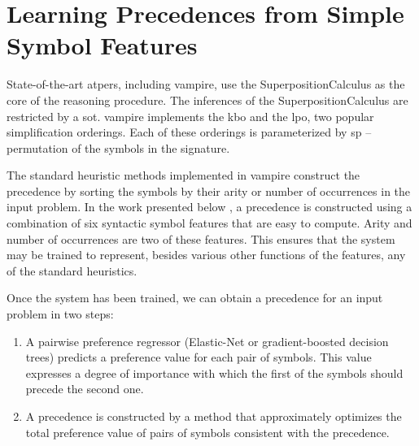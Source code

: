 \newcommand*{\IncludePaper}[2][height=\paperheight-1.5in]{}

\newcommand{\ResultSection}{\chapter}


\ResultSection{Learning Precedences from Simple Symbol Features}
\label{sec:results:simple}

State-of-the-art \glspl{atper}, including \gls{vampire}, use the \gls{SuperpositionCalculus} as the core of the reasoning procedure.
The inferences of the \gls{SuperpositionCalculus} are restricted by a \gls{sot}.
\Gls{vampire} implements the \acrfull{kbo} and the \gls{lpo}, two popular simplification orderings.
Each of these orderings is parameterized by \gls{sp} -- permutation of the symbols in the signature.

The standard heuristic methods implemented in \gls{vampire} construct the \gls{precedence} by sorting the symbols by their arity or number of occurrences in the input problem.
In the work presented below \cite{DBLP:conf/cade/Bartek020},
a \gls{precedence} is constructed using a combination of six syntactic symbol features that are easy to compute.
Arity and number of occurrences are two of these features.
This ensures that the system may be trained to represent, besides various other functions of the features, any of the standard heuristics.

Once the system has been trained,
we can obtain a precedence for an input problem in two steps:
\begin{enumerate}
\item A pairwise preference regressor (Elastic-Net or gradient-boosted decision trees) predicts a preference value for each pair of symbols.
This value expresses a degree of importance with which the first of the symbols should precede the second one.
\item A precedence is constructed
by a method that approximately optimizes the total preference value of pairs of symbols consistent with the precedence.
\end{enumerate}

